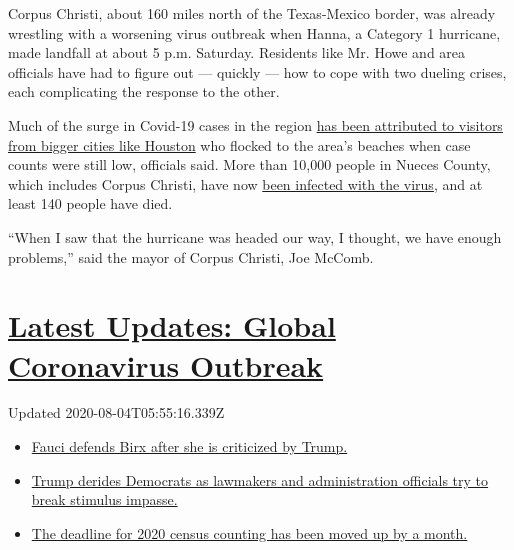 Corpus Christi, about 160 miles north of the Texas-Mexico border, was
already wrestling with a worsening virus outbreak when Hanna, a Category
1 hurricane, made landfall at about 5 p.m. Saturday. Residents like Mr.
Howe and area officials have had to figure out --- quickly --- how to
cope with two dueling crises, each complicating the response to the
other.

Much of the surge in Covid-19 cases in the region
\href{https://www.nytimes.com/2020/07/11/us/coronavirus-texas-corpus-christi.html}{has
been attributed to visitors from bigger cities like Houston} who flocked
to the area's beaches when case counts were still low, officials said.
More than 10,000 people in Nueces County, which includes Corpus Christi,
have now
\href{https://www.nytimes.com/interactive/2020/us/texas-coronavirus-cases.html}{been
infected with the virus}, and at least 140 people have died.

``When I saw that the hurricane was headed our way, I thought, we have
enough problems,'' said the mayor of Corpus Christi, Joe McComb.

\hypertarget{latest-updates-global-coronavirus-outbreak}{%
\section{\texorpdfstring{\href{https://www.nytimes.com/2020/08/03/world/coronavirus-covid-19.html?action=click\&pgtype=Article\&state=default\&region=MAIN_CONTENT_1\&context=storylines_live_updates}{Latest
Updates: Global Coronavirus
Outbreak}}{Latest Updates: Global Coronavirus Outbreak}}\label{latest-updates-global-coronavirus-outbreak}}

Updated 2020-08-04T05:55:16.339Z

\begin{itemize}
\tightlist
\item
  \href{https://www.nytimes.com/2020/08/03/world/coronavirus-covid-19.html?action=click\&pgtype=Article\&state=default\&region=MAIN_CONTENT_1\&context=storylines_live_updates\#link-4547638f}{Fauci
  defends Birx after she is criticized by Trump.}
\item
  \href{https://www.nytimes.com/2020/08/03/world/coronavirus-covid-19.html?action=click\&pgtype=Article\&state=default\&region=MAIN_CONTENT_1\&context=storylines_live_updates\#link-15e7f995}{Trump
  derides Democrats as lawmakers and administration officials try to
  break stimulus impasse.}
\item
  \href{https://www.nytimes.com/2020/08/03/world/coronavirus-covid-19.html?action=click\&pgtype=Article\&state=default\&region=MAIN_CONTENT_1\&context=storylines_live_updates\#link-e5a2cda}{The
  deadline for 2020 census counting has been moved up by a month.}
\end{itemize}

